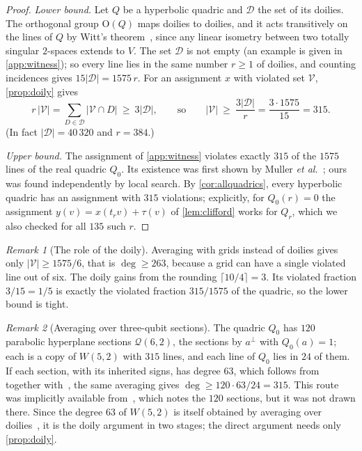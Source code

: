 \documentclass[11pt]{article}
\theoremstyle{definition}
\theoremstyle{remark}
\newtheorem{remark}[remark]{Remark}
\newcommand{\dg}{\operatorname{deg}}
\newcommand{\GO}{\mathrm{O}}
\begin{document}
\begin{proof}
\emph{Lower bound.}
Let $Q$ be a hyperbolic quadric and $\mathcal D$ the set of its doilies.
The orthogonal group $\GO(Q)$ maps doilies to doilies, and it acts transitively on the lines of $Q$ by Witt's theorem~\cite{Taylor92}, since any linear isometry between two totally singular $2$-spaces extends to $V$.
The set $\mathcal D$ is not empty (an example is given in \cref{app:witness}); so every line lies in the same number $r\ge1$ of doilies, and counting incidences gives $15|\mathcal D|=1575\,r$.
For an assignment $x$ with violated set $\mathcal V$, \cref{prop:doily} gives
\[r\,|\mathcal V|=\sum_{D\in\mathcal D}|\mathcal V\cap D|\ \ge\ 3|\mathcal D|,\qquad\text{so}\qquad|\mathcal V|\ \ge\ \frac{3|\mathcal D|}{r}=\frac{3\cdot1575}{15}=315.\]
(In fact $|\mathcal D|=40\,320$ and $r=384$.)

\emph{Upper bound.}
The assignment of \cref{app:witness} violates exactly $315$ of the $1575$ lines of the real quadric $Q_0$.
Its existence was first shown by Muller \emph{et al.}~\cite{Muller24}; ours was found independently by local search.
By \cref{cor:allquadrics}, every hyperbolic quadric has an assignment with $315$ violations; explicitly, for $Q_0(r)=0$ the assignment $y(v)=x(t_rv)+\tau(v)$ of \cref{lem:clifford} works for $Q_r$, which we also checked for all $135$ such $r$.
\end{proof}

\begin{remark}[The role of the doily]
Averaging with grids instead of doilies gives only $|\mathcal V|\ge1575/6$, that is $\dg\ge263$, because a grid can have a single violated line out of six.
The doily gains from the rounding $\lceil10/4\rceil=3$.
Its violated fraction $3/15=1/5$ is exactly the violated fraction $315/1575$ of the quadric, so the lower bound is tight.
\end{remark}

\begin{remark}[Averaging over three-qubit sections]
The quadric $Q_0$ has $120$ parabolic hyperplane sections $\mathcal Q(6,2)$, the sections by $a^\perp$ with $Q_0(a)=1$; each is a copy of $W(5,2)$ with $315$ lines, and each line of $Q_0$ lies in $24$ of them.
If each section, with its inherited signs, has degree $63$, which follows from~\cite{Saniga24hex} together with~\cite[Thm.~5]{MullerGiorgetti24}, the same averaging gives $\dg\ge120\cdot63/24=315$.
This route was implicitly available from~\cite[\S5.1.2]{Muller24}, which notes the $120$ sections, but it was not drawn there. Since the degree $63$ of $W(5,2)$ is itself obtained by averaging over doilies~\cite[\S4.1]{Saniga24hex}, it is the doily argument in two stages; the direct argument needs only \cref{prop:doily}.
\end{remark}
\end{document}
